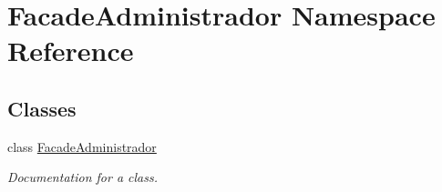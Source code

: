 \hypertarget{namespace_facade_administrador}{}\section{Facade\+Administrador Namespace Reference}
\label{namespace_facade_administrador}
\subsection*{Classes}
\begin{DoxyCompactItemize}
\item 
class \mbox{\hyperlink{class_facade_administrador_1_1_facade_administrador}{Facade\+Administrador}}
\begin{DoxyCompactList}\small\item\em Documentation for a class. \end{DoxyCompactList}\end{DoxyCompactItemize}
